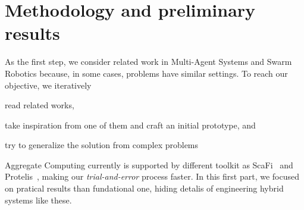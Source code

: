 \documentclass[conference]{IEEEtran}
\begin{document}
\section{Methodology and preliminary results}
%
As the first step, we consider related work in Multi-Agent Systems and Swarm Robotics because, in some cases, problems have similar settings.
To reach our objective, we iteratively 
\begin{enumerate*}[label=(\roman*)]
\item read related works,
\item take inspiration from one of them and craft an initial prototype, and
\item try to generalize the solution from complex problems
\end{enumerate*}
Aggregate Computing currently is supported by different toolkit as ScaFi~\cite{DBLP:conf/ecoop/CasadeiV16} and Protelis~\cite{DBLP:conf/sac/PianiniVB15}, making
our \emph{trial-and-error} process faster. In this first part, we focused on pratical results than fundational one, hiding detalis of engineering 
hybrid systems like these.  
\end{document}

